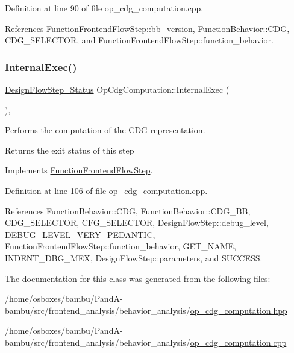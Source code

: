 Definition at line 90 of file op\+\_\+cdg\+\_\+computation.\+cpp.



References Function\+Frontend\+Flow\+Step\+::bb\+\_\+version, Function\+Behavior\+::\+C\+DG, C\+D\+G\+\_\+\+S\+E\+L\+E\+C\+T\+OR, and Function\+Frontend\+Flow\+Step\+::function\+\_\+behavior.

\mbox{\label{classOpCdgComputation_ae450186646ed8dea812526b558b5263a}} 
\subsubsection{\texorpdfstring{Internal\+Exec()}{InternalExec()}}
{\footnotesize\ttfamily \hyperlink{design__flow__step_8hpp_afb1f0d73069c26076b8d31dbc8ebecdf}{Design\+Flow\+Step\+\_\+\+Status} Op\+Cdg\+Computation\+::\+Internal\+Exec (\begin{DoxyParamCaption}{ }\end{DoxyParamCaption})\hspace{0.3cm}{\ttfamily [override]}, {\ttfamily [virtual]}}



Performs the computation of the C\+DG representation. 

\begin{DoxyReturn}{Returns}
the exit status of this step 
\end{DoxyReturn}


Implements \hyperlink{classFunctionFrontendFlowStep_a00612f7fb9eabbbc8ee7e39d34e5ac68}{Function\+Frontend\+Flow\+Step}.



Definition at line 106 of file op\+\_\+cdg\+\_\+computation.\+cpp.



References Function\+Behavior\+::\+C\+DG, Function\+Behavior\+::\+C\+D\+G\+\_\+\+BB, C\+D\+G\+\_\+\+S\+E\+L\+E\+C\+T\+OR, C\+F\+G\+\_\+\+S\+E\+L\+E\+C\+T\+OR, Design\+Flow\+Step\+::debug\+\_\+level, D\+E\+B\+U\+G\+\_\+\+L\+E\+V\+E\+L\+\_\+\+V\+E\+R\+Y\+\_\+\+P\+E\+D\+A\+N\+T\+IC, Function\+Frontend\+Flow\+Step\+::function\+\_\+behavior, G\+E\+T\+\_\+\+N\+A\+ME, I\+N\+D\+E\+N\+T\+\_\+\+D\+B\+G\+\_\+\+M\+EX, Design\+Flow\+Step\+::parameters, and S\+U\+C\+C\+E\+SS.



The documentation for this class was generated from the following files\+:\begin{DoxyCompactItemize}
\item 
/home/osboxes/bambu/\+Pand\+A-\/bambu/src/frontend\+\_\+analysis/behavior\+\_\+analysis/\hyperlink{op__cdg__computation_8hpp}{op\+\_\+cdg\+\_\+computation.\+hpp}\item 
/home/osboxes/bambu/\+Pand\+A-\/bambu/src/frontend\+\_\+analysis/behavior\+\_\+analysis/\hyperlink{op__cdg__computation_8cpp}{op\+\_\+cdg\+\_\+computation.\+cpp}\end{DoxyCompactItemize}

